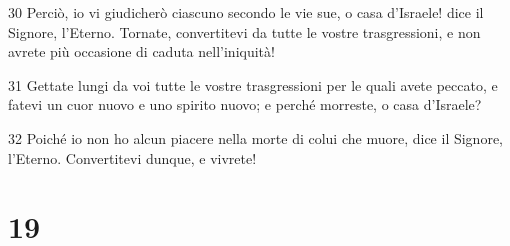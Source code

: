 \par 30 Perciò, io vi giudicherò ciascuno secondo le vie sue, o casa d'Israele! dice il Signore, l'Eterno. Tornate, convertitevi da tutte le vostre trasgressioni, e non avrete più occasione di caduta nell'iniquità!
\par 31 Gettate lungi da voi tutte le vostre trasgressioni per le quali avete peccato, e fatevi un cuor nuovo e uno spirito nuovo; e perché morreste, o casa d'Israele?
\par 32 Poiché io non ho alcun piacere nella morte di colui che muore, dice il Signore, l'Eterno. Convertitevi dunque, e vivrete!

\chapter{19}


